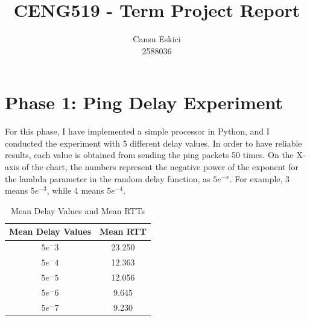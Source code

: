 \documentclass[10pt,a4paper]{article}
\title{CENG519 - Term Project Report}
\author{
  Cansu Eskici\\
  2588036}
\begin{document}
\maketitle
\section*{Phase 1: Ping Delay Experiment}
For this phase, I have implemented a simple processor in Python, and I conducted the experiment with 5 different delay values. 
In order to have reliable results, each value is obtained from sending the ping packets 50 times. 
On the X-axis of the chart, the numbers represent the negative power of the exponent for the lambda parameter in the random delay function, as $5e^{-x}$. For example, 3 means $5e^{-3}$, while 4 means $5e^{-4}$.


\vspace{1cm}

\begin{minipage}{0.5\textwidth}
\end{minipage}
\begin{minipage}{0.5\textwidth}
    \begin{table}[H]
    \centering
    \begin{tabular}{|c|c|}
        \hline
        Mean Delay Values & Mean RTT \\
        \hline
        ${5e^-3}$ & 23.250 \\
        ${5e^-4}$ & 12.363 \\
        ${5e^-5}$ & 12.056 \\
        ${5e^-6}$ & 9.645 \\
        ${5e^-7}$ & 9.230 \\
        \hline
    \end{tabular}
    \caption*{Mean Delay Values and Mean RTTs }
    \label{tab:xy_table}
\end{table}
\end{minipage}
\vspace{0.4cm}
\end{document}
